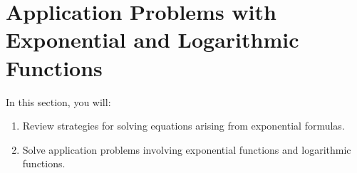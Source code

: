\section{Application Problems with Exponential and Logarithmic Functions}

In this section, you will:
\begin{enumerate}
    \item Review strategies for solving equations arising from exponential formulas.
    \item Solve application problems involving exponential functions and logarithmic functions.
\end{enumerate}